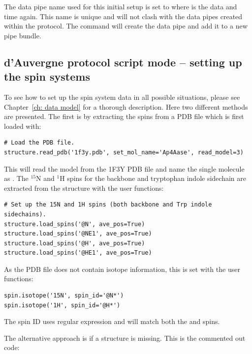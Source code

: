 \begin{htmlonly}
\begin{htmlonly}
The data pipe name used for this initial setup is set to  where  is the data and time again.  This name is unique and will not clash with the data pipes created within the protocol.  The  command will create the data pipe and add it to a new pipe bundle.



\subsection{d'Auvergne protocol script mode -- setting up the spin systems}

To see how to set up the spin system data in all possible situations, please see Chapter~\ref{ch: data model} for a thorough description.  Here two different methods are presented.  The first is by extracting the spins from a PDB file which is first loaded with:

\begin{lstlisting}[firstnumber=161]
# Load the PDB file.
structure.read_pdb('1f3y.pdb', set_mol_name='Ap4Aase', read_model=3)
\end{lstlisting}

This will read the  model from the 1F3Y PDB file and name the single molecule as .  The $^{15}$N and $^1$H spins for the backbone and tryptophan indole sidechain are extracted from the structure with the user functions:

\begin{lstlisting}[firstnumber=164]
# Set up the 15N and 1H spins (both backbone and Trp indole sidechains).
structure.load_spins('@N', ave_pos=True)
structure.load_spins('@NE1', ave_pos=True)
structure.load_spins('@H', ave_pos=True)
structure.load_spins('@HE1', ave_pos=True)
\end{lstlisting}

As the PDB file does not contain isotope information, this is set with the user functions:

\begin{lstlisting}[firstnumber=169]
spin.isotope('15N', spin_id='@N*')
spin.isotope('1H', spin_id='@H*')
\end{lstlisting}

The spin ID  uses regular expression and will match both the  and  spins.

The alternative approach is if a structure is missing.  This is the commented out code:


\end{htmlonly}
\end{htmlonly}
